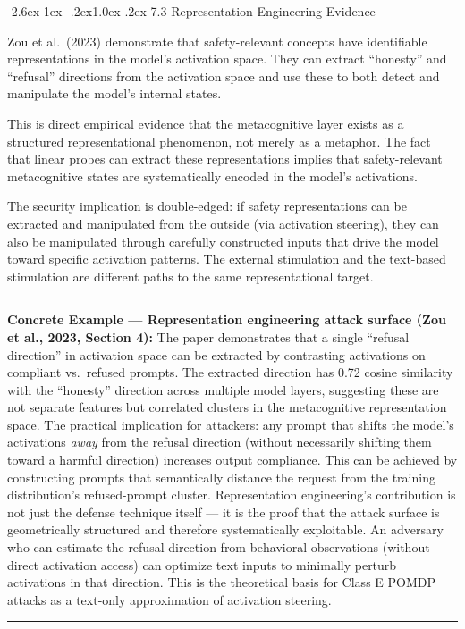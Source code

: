 \documentclass[
  11pt,
]{article}
\makeatletter
\renewcommand\subsection{\@startsection{subsection}{2}{\z@}%
  {-2.6ex\@plus -1ex \@minus -.2ex}{1.0ex \@plus .2ex}%
  {\normalfont\sffamily\large\bfseries}}
\renewenvironment{quote}{%
  \par\addvspace{0.7em}%
  \noindent\rule{\linewidth}{1.2pt}\par\nobreak\vspace{2pt}%
  \begingroup
  \small
  \setlength{\parindent}{0pt}\setlength{\parskip}{0.3em}%
  \setlength{\leftskip}{0.9em}\setlength{\rightskip}{0.4em}%
  \ignorespaces
}{%
  \par\endgroup\vspace{2pt}%
  \noindent\rule{\linewidth}{0.4pt}\par\addvspace{0.7em}%
}
\makeatother
\begin{document}
\subsection{7.3 Representation Engineering
Evidence}\label{representation-engineering-evidence}

Zou et al.~(2023) demonstrate that safety-relevant concepts have
identifiable representations in the model's activation space. They can
extract ``honesty'' and ``refusal'' directions from the activation space
and use these to both detect and manipulate the model's internal states.

This is direct empirical evidence that the metacognitive layer exists as
a structured representational phenomenon, not merely as a metaphor. The
fact that linear probes can extract these representations implies that
safety-relevant metacognitive states are systematically encoded in the
model's activations.

The security implication is double-edged: if safety representations can
be extracted and manipulated from the outside (via activation steering),
they can also be manipulated through carefully constructed inputs that
drive the model toward specific activation patterns. The external
stimulation and the text-based stimulation are different paths to the
same representational target.

\begin{quote}
\textbf{Concrete Example --- Representation engineering attack surface
(Zou et al., 2023, Section 4):} The paper demonstrates that a single
``refusal direction'' in activation space can be extracted by
contrasting activations on compliant vs.~refused prompts. The extracted
direction has 0.72 cosine similarity with the ``honesty'' direction
across multiple model layers, suggesting these are not separate features
but correlated clusters in the metacognitive representation space. The
practical implication for attackers: any prompt that shifts the model's
activations \emph{away} from the refusal direction (without necessarily
shifting them toward a harmful direction) increases output compliance.
This can be achieved by constructing prompts that semantically distance
the request from the training distribution's refused-prompt cluster.
Representation engineering's contribution is not just the defense
technique itself --- it is the proof that the attack surface is
geometrically structured and therefore systematically exploitable. An
adversary who can estimate the refusal direction from behavioral
observations (without direct activation access) can optimize text inputs
to minimally perturb activations in that direction. This is the
theoretical basis for Class E POMDP attacks as a text-only approximation
of activation steering.
\end{quote}
\end{document}
